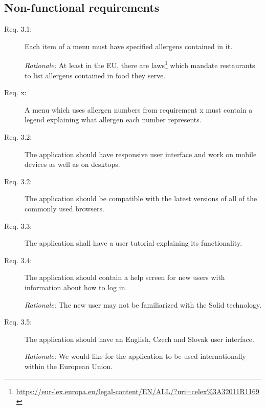 \subsection{Non-functional requirements}
\begin{description}
    \item [Req. 3.1:] Each item of a menu must have specified allergens contained in it.
    
    \emph{Rationale:} At least in the EU, there are laws\footnote{\url{https://eur-lex.europa.eu/legal-content/EN/ALL/?uri=celex\%3A32011R1169}  \label{fnlabel}} which mandate restaurants to list allergens contained in food they serve.
    \item [Req. x:] A menu which uses allergen numbers from requirement x must contain a legend explaining what allergen each number represents.
    \item [Req. 3.2:] The application should have responsive user interface and work on mobile devices as well as on desktops.
    \item [Req. 3.2:] The application should be compatible with the latest versions of all of the commonly used browsers.
    \item [Req. 3.3:] The application shall have a user tutorial explaining its functionality.
    \item [Req. 3.4:] The application should contain a help screen for new users with information about how to log in.

    \emph{Rationale:} The new user may not be familiarized with the Solid technology.
    \item [Req. 3.5:] The application should have an English, Czech and Slovak user interface.

    \emph{Rationale:} We would like for the application to be used internationally within the European Union.
\end{description}

\vspace*{\fill}